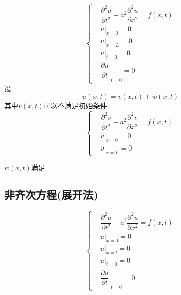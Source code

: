 \documentclass{article}
\begin{document}
\begin{equation*}
  \left\{
  \begin{aligned}
    & \dfrac{\partial^{2} u}{\partial t^{2}} - a^{2} \dfrac{\partial^{2} u}{\partial x^{2}} = f(x,t) \\
    & u |_{x=0} = 0\\
    & u |_{x=L} = 0\\
    & u |_{t=0} = 0\\
    & \!\!\left. \dfrac{\partial u}{\partial t} \right|_{t=0} = 0
  \end{aligned}
  \right.
\end{equation*}
设
\begin{equation*}
  u(x,t) = v(x,t) + w(x,t)
\end{equation*}
其中$v(x,t)$可以不满足初始条件
\begin{equation*}
  \left\{
  \begin{aligned}
    & \dfrac{\partial^{2} v}{\partial t^{2}} - a^{2} \dfrac{\partial^{2} v}{\partial x^{2}} = f(x,t) \\
    & v |_{x=0} = 0\\
    & v |_{x=L} = 0
  \end{aligned}
  \right.
\end{equation*}

$w(x,t)$满足


\subsection{非齐次方程(展开法)}
\begin{equation*}
  \left\{
  \begin{aligned}
    & \dfrac{\partial^{2} u}{\partial t^{2}} - a^{2} \dfrac{\partial^{2} u}{\partial x^{2}} = f(x,t) \\
    & u |_{x=0} = 0\\
    & u |_{x=l} = 0\\
    & u |_{t=0} = 0\\
    & \!\!\left. \dfrac{\partial u}{\partial t} \right|_{t=0} = 0
  \end{aligned}
  \right.
\end{equation*}
\end{document}
